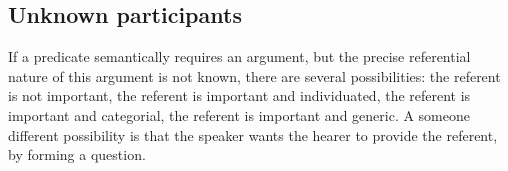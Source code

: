 %
%
%
%
%
%
%
%

\subsection{Unknown participants}\label{sec:func:Unknownparticipants}
If a predicate semantically requires an argument, but the precise referential nature of this argument is not known, there are several possibilities: the referent is not important, the referent is important and individuated, the referent is important and categorial, the referent is important and generic. A someone different possibility is that the speaker wants the hearer to provide the referent, by forming a question.

